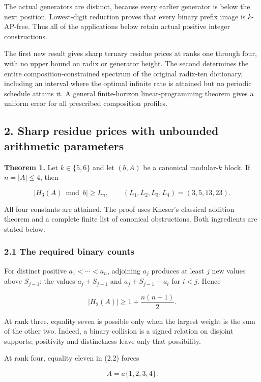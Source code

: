 The actual generators are distinct, because every earlier generator is below the next position. Lowest-digit reduction proves that every binary prefix image is \(k\)-AP-free. Thus all of the applications below retain actual positive integer constructions.

The first new result gives sharp ternary residue prices at ranks one through four, with no upper bound on radix or generator height. The second determines the entire composition-constrained spectrum of the original radix-ten dictionary, including an interval where the optimal infinite rate is attained but no periodic schedule attains it. A general finite-horizon linear-programming theorem gives a uniform error for all prescribed composition profiles.

\subsection{2. Sharp residue prices with unbounded arithmetic parameters}\label{sharp-residue-prices-with-unbounded-arithmetic-parameters}

\textbf{Theorem 1.} Let \(k\in\{5,6\}\) and let \((b,A)\) be a canonical modular-\(k\) block. If \(n=|A|\le4\), then

\[
\boxed{|H_3(A)\bmod b|\ge L_n,\qquad
(L_1,L_2,L_3,L_4)=(3,5,13,23).}
\tag{2.1}
\]

All four constants are attained. The proof uses Kneser's classical addition theorem and a complete finite list of canonical obstructions. Both ingredients are stated below.

\subsubsection{2.1 The required binary counts}\label{the-required-binary-counts}

For distinct positive \(a_1<\cdots<a_n\), adjoining \(a_j\) produces at least \(j\) new values above \(S_{j-1}\): the values \(a_j+S_{j-1}\) and \(a_j+S_{j-1}-a_i\) for \(i<j\). Hence

\[
|H_2(A)|\ge1+\frac{n(n+1)}2.
\tag{2.2}
\]

At rank three, equality seven is possible only when the largest weight is the sum of the other two. Indeed, a binary collision is a signed relation on disjoint supports; positivity and distinctness leave only that possibility.

At rank four, equality eleven in (2.2) forces

\[
A=a\{1,2,3,4\}.
\tag{2.3}
\]

